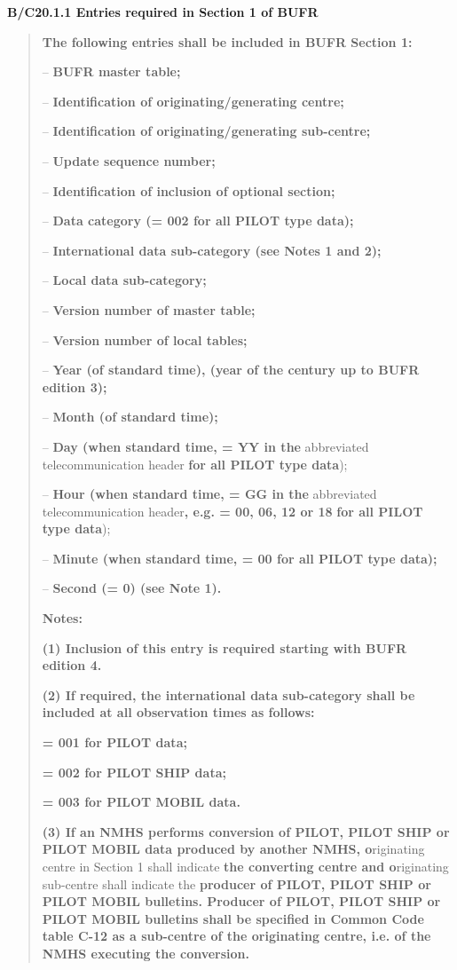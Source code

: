 \textbf{B/C20.1.1 Entries required in Section 1 of BUFR}

\begin{quote}
\textbf{The following entries shall be included in BUFR Section 1:}

-- \textbf{BUFR master table;}

-- \textbf{Identification of originating/generating centre;}

-- \textbf{Identification of originating/generating sub-centre;}

-- \textbf{Update sequence number;}

-- \textbf{Identification of inclusion of optional section;}

-- \textbf{Data category (= 002 for all PILOT type data);}

-- \textbf{International data sub-category (see Notes 1 and 2);}

-- \textbf{Local data sub-category;}

-- \textbf{Version number of master table;}

-- \textbf{Version number of local tables;}

-- \textbf{Year (of standard time), (year of the century up to BUFR edition 3);}

-- \textbf{Month (of standard time);}

-- \textbf{Day (when standard time, = YY in the} abbreviated telecommunication header \textbf{for all PILOT type data});

-- \textbf{Hour (when standard time, = GG in the} abbreviated telecommunication header\textbf{, e.g. = 00, 06, 12 or 18} \textbf{for all PILOT type data});

-- \textbf{Minute (when standard time, = 00 for all PILOT type data);}

-- \textbf{Second (= 0) (see Note 1).}

\textbf{Notes:}

\textbf{(1) Inclusion of this entry is required starting with BUFR edition 4.}

\textbf{(2) If required, the international data sub-category shall be included at all observation times as follows:}

\textbf{= 001 for PILOT data;}

\textbf{= 002 for PILOT SHIP data;}

\textbf{= 003 for PILOT MOBIL data.}

\textbf{(3) If an NMHS performs conversion of PILOT, PILOT SHIP or PILOT MOBIL data produced by another NMHS, o}riginating centre in Section 1 shall indicate \textbf{the converting centre and o}riginating sub-centre shall indicate the \textbf{producer of PILOT, PILOT SHIP or PILOT MOBIL bulletins. Producer of PILOT, PILOT SHIP or PILOT MOBIL bulletins shall be specified in Common Code table C-12 as a sub-centre of the originating centre, i.e. of the NMHS executing the conversion.}
\end{quote}

